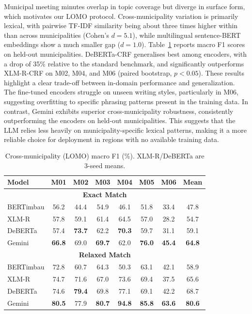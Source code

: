 \documentclass[11pt]{article}
\begin{document}
Municipal meeting minutes overlap in topic coverage but diverge in surface form, which motivates our LOMO protocol. Cross-municipality variation is primarily lexical, with pairwise TF-IDF similarity being about three times higher within than across municipalities (Cohen's $d{=}5.1$), while multilingual sentence-BERT embeddings \cite{reimers-2019-sentence-bert} show a much smaller gap ($d{=}1.0$). Table~\ref{tab:cross_muni} reports macro F1 scores on held-out municipalities. DeBERTa-CRF generalises best among encoders, with a drop of 35\% relative to the standard benchmark, and significantly outperforms XLM-R-CRF on M02, M04, and M06 (paired bootstrap, $p<0.05$). These results highlight a clear trade-off between in-domain performance and generalization. The fine-tuned encoders struggle on unseen writing styles, particularly in M06, suggesting overfitting to specific phrasing patterns present in the training data. In contrast, Gemini exhibits superior cross-municipality robustness, consistently outperforming the encoders on held-out municipalities. This suggests that the LLM relies less heavily on municipality-specific lexical patterns, making it a more reliable choice for deployment in regions with no available training data.

\begin{table}[ht!]
\centering
\footnotesize
\setlength{\tabcolsep}{0pt}
\caption{Cross-municipality (LOMO) macro F1 (\%). XLM-R/DeBERTa are 3-seed means.}
\label{tab:cross_muni}
\begin{tabular*}{\columnwidth}{@{\extracolsep{\fill}} l ccccccc @{}}
\toprule
\textbf{Model} & \textbf{M01} & \textbf{M02} & \textbf{M03} & \textbf{M04} & \textbf{M05} & \textbf{M06} & \textbf{Mean} \\
\midrule
\multicolumn{8}{c}{\textbf{Exact Match}} \\
\midrule
BERTimbau  & 56.2 & 44.4 & 54.9 & 46.1 & 51.8 & 33.4 & 47.8 \\
XLM-R      & 57.8 & 59.1 & 61.4 & 64.5 & 57.0 & 28.2 & 54.7 \\
DeBERTa    & 57.4 & \textbf{73.7} & 62.2 & \textbf{70.3} & 59.7 & 31.1 & 59.1 \\
Gemini     & \textbf{66.8} & 69.0 & \textbf{69.7} & 62.0 & \textbf{76.0} & \textbf{45.4} & \textbf{64.8} \\
\midrule
\multicolumn{8}{c}{\textbf{Relaxed Match}} \\
\midrule
BERTimbau  & 72.8 & 60.7 & 64.3 & 50.3 & 63.1 & 42.1 & 58.9 \\
XLM-R      & 74.7 & 71.6 & 67.0 & 73.6 & 69.4 & 37.5 & 65.6 \\
DeBERTa    & 74.6 & \textbf{79.4} & 69.8 & 77.1 & 69.1 & 42.2 & 68.7 \\
Gemini     & \textbf{80.5} & 77.9 & \textbf{80.7} & \textbf{94.8} & \textbf{85.8} & \textbf{63.6} & \textbf{80.6} \\
\bottomrule
\end{tabular*}
\end{table}
\end{document}
